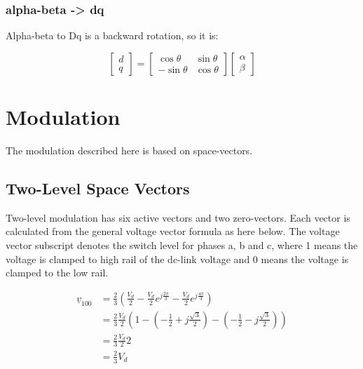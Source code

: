 \documentclass[]{book}
\begin{document}
\hypertarget{alpha-beta---dq}{%
\subsection{alpha-beta -\textgreater{} dq}\label{alpha-beta---dq}}

Alpha-beta to Dq is a backward rotation, so it is:

\[
\begin{bmatrix} d \\  q  \end{bmatrix}=
\begin{bmatrix} \cos\theta & \sin\theta \\  -\sin\theta & \cos\theta  \end{bmatrix}
\begin{bmatrix} \alpha \\ \beta  \end{bmatrix} 
\label{eq:transDqAb}
\]

\hypertarget{modulation}{%
\chapter{Modulation}\label{modulation}}

The modulation described here is based on space-vectors.

\hypertarget{two-level-space-vectors}{%
\section{Two-Level Space Vectors}\label{two-level-space-vectors}}

Two-level modulation has six active vectors and two zero-vectors. Each vector is calculated from the general voltage vector formula as here below. The voltage vector subscript denotes the switch level for phases a, b and c, where 1 means the voltage is clamped to high rail of the dc-link voltage and 0 means the voltage is clamped to the low rail.

\[
\begin{aligned}
\underline{v}_{100} 
& = \frac{2}{3} \left( \frac{V_d}{2} - \frac{V_d}{2} e^{j \frac{2 \pi}{3}}- \frac{V_d}{2} e^{j \frac{4 \pi}{3}} \right)\\
& = \frac{2}{3} \frac{V_d}{2} \left( 1-  (- \frac{1}{2}+j\frac{\sqrt{3}}{2}) - (- \frac{1}{2}-j\frac{\sqrt{3}}{2}) \right)\\
& = \frac{2}{3} \frac{V_d}{2} 2\\
& = \frac{2}{3} V_d\\
\end{aligned}
\]
\end{document}
